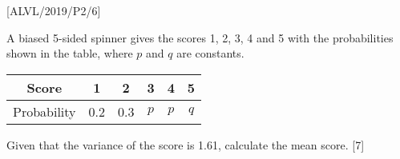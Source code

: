 \item {[}ALVL/2019/P2/6{]} 

A biased 5-sided spinner gives the scores 1, 2, 3, 4 and 5 with the
probabilities shown in the table, where $p$ and $q$ are constants.
\begin{center}
\begin{tabular}{|c|c|c|c|c|c|}
\hline 
Score & 1 & 2 & 3 & 4 & 5\tabularnewline
\hline 
Probability & 0.2 & 0.3 & $p$ & $p$ & $q$\tabularnewline
\hline 
\end{tabular}
\par\end{center}

Given that the variance of the score is 1.61, calculate the mean score.
\hfill{}{[}7{]}
